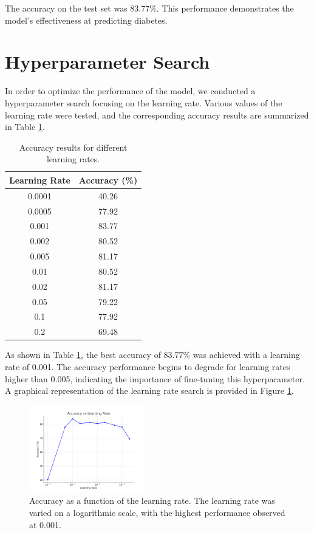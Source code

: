 \documentclass[10pt,twocolumn,letterpaper]{article}
\begin{document}
\noindent
The accuracy on the test set was 83.77\%. This performance demonstrates the model's effectiveness at predicting diabetes.


\section{Hyperparameter Search}
In order to optimize the performance of the model, we conducted a hyperparameter search focusing on the learning rate. Various values of the learning rate were tested, and the corresponding accuracy results are summarized in Table \ref{tab:learning_rate}.

\begin{table}[h]
\centering
\caption{Accuracy results for different learning rates.}
\begin{tabular}{|c|c|}
\hline
\textbf{Learning Rate} & \textbf{Accuracy (\%)} \\
\hline
0.0001 & 40.26 \\
0.0005 & 77.92 \\
0.001  & 83.77 \\
0.002  & 80.52 \\
0.005  & 81.17 \\
0.01   & 80.52 \\
0.02   & 81.17 \\
0.05   & 79.22 \\
0.1    & 77.92 \\
0.2    & 69.48 \\
\hline
\end{tabular}
\label{tab:learning_rate}
\end{table}

As shown in Table \ref{tab:learning_rate}, the best accuracy of 83.77\% was achieved with a learning rate of 0.001. The accuracy performance begins to degrade for learning rates higher than 0.005, indicating the importance of fine-tuning this hyperparameter. A graphical representation of the learning rate search is provided in Figure \ref{fig:lr_search}.

\begin{figure}[h]
    \centering
    \includegraphics[width=0.45\textwidth]{lr.png}
    \caption{Accuracy as a function of the learning rate. The learning rate was varied on a logarithmic scale, with the highest performance observed at 0.001.}
    \label{fig:lr_search}
\end{figure}
\end{document}
